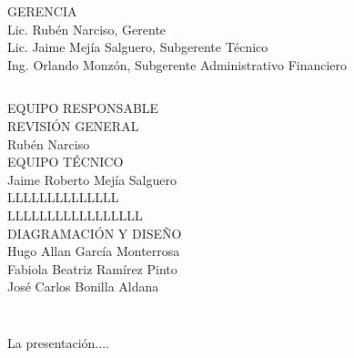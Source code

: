 {\begin{center}
		
		
		
		
		{\Bold \large \color{color1!89!black} GERENCIA}\\[0.2cm]
		Lic. Rubén Narciso, Gerente\\
		Lic. Jaime Mejía Salguero, Subgerente Técnico\\
		Ing. Orlando Monzón, Subgerente Administrativo Financiero\\
		
		
	\end{center}
}{}
\clearpage

$\ $
\vspace{0.5cm}

\begin{center}
	{\Bold \LARGE EQUIPO RESPONSABLE}\\[1.5cm]
	
	{\Bold \large \color{color1!89!black} REVISIÓN GENERAL}\\[0.2cm]
	Rubén Narciso\\[0.8cm]
	
	
	{\Bold \large \color{color1!89!black} EQUIPO TÉCNICO}\\[0.2cm]
	Jaime Roberto Mejía Salguero\\
	LLLLLLLLLLLLLL\\
	LLLLLLLLLLLLLLLLL\\[0.8cm]
	
	{\Bold \large \color{color1!89!black} DIAGRAMACIÓN Y DISEÑO}\\[0.2cm]
	Hugo Allan García Monterrosa\\
	Fabiola Beatriz Ramírez Pinto\\
	José Carlos Bonilla Aldana\\[0.8cm]
	
	
	
\end{center}\setcounter{page}{0}\cleardoublepage



$\ $\\[0.7cm]

\tableofcontents

\cleardoublepage
\pagestyle{estandar}
\setcounter{page}{1}
\setlength{\arrayrulewidth}{1.0pt}


\cleardoublepage





$\ $\\[0.5cm]
\thispagestyle{empty}




$\ $\\



La presentación....

\thispagestyle{empty}


\cleardoublepage

